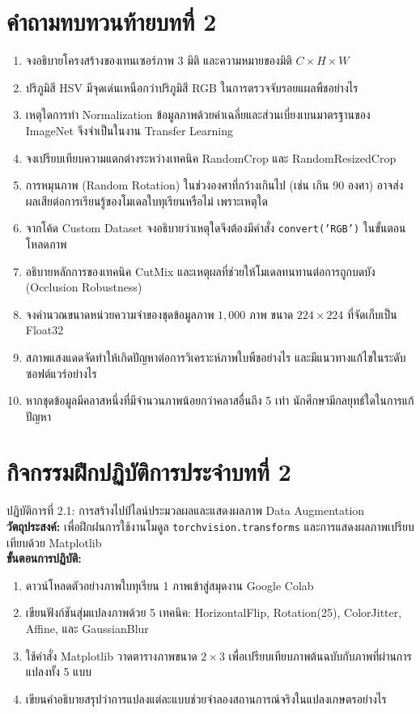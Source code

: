 \section*{คำถามทบทวนท้ายบทที่ 2}
\begin{enumerate}[leftmargin=1.8em, itemsep=4pt]
    \item จงอธิบายโครงสร้างของเทนเซอร์ภาพ 3 มิติ และความหมายของมิติ $C \times H \times W$
    \item ปริภูมิสี HSV มีจุดเด่นเหนือกว่าปริภูมิสี RGB ในการตรวจจับรอยแผลพืชอย่างไร
    \item เหตุใดการทำ Normalization ข้อมูลภาพด้วยค่าเฉลี่ยและส่วนเบี่ยงเบนมาตรฐานของ ImageNet จึงจำเป็นในงาน Transfer Learning
    \item จงเปรียบเทียบความแตกต่างระหว่างเทคนิค RandomCrop และ RandomResizedCrop
    \item การหมุนภาพ (Random Rotation) ในช่วงองศาที่กว้างเกินไป (เช่น เกิน 90 องศา) อาจส่งผลเสียต่อการเรียนรู้ของโมเดลใบทุเรียนหรือไม่ เพราะเหตุใด
    \item จากโค้ด Custom Dataset จงอธิบายว่าเหตุใดจึงต้องมีคำสั่ง \texttt{convert('RGB')} ในขั้นตอนโหลดภาพ
    \item อธิบายหลักการของเทคนิค CutMix และเหตุผลที่ช่วยให้โมเดลทนทานต่อการถูกบดบัง (Occlusion Robustness)
    \item จงคำนวณขนาดหน่วยความจำของชุดข้อมูลภาพ $1,000$ ภาพ ขนาด $224 \times 224$ ที่จัดเก็บเป็น Float32
    \item สภาพแสงแดดจัดทำให้เกิดปัญหาต่อการวิเคราะห์ภาพใบพืชอย่างไร และมีแนวทางแก้ไขในระดับซอฟต์แวร์อย่างไร
    \item หากชุดข้อมูลมีคลาสหนึ่งที่มีจำนวนภาพน้อยกว่าคลาสอื่นถึง 5 เท่า นักศึกษามีกลยุทธ์ใดในการแก้ปัญหา
\end{enumerate}

\section*{กิจกรรมฝึกปฏิบัติการประจำบทที่ 2}
\begin{nocodebox}{ปฏิบัติการที่ 2.1: การสร้างไปป์ไลน์ประมวลผลและแสดงผลภาพ Data Augmentation}
\textbf{วัตถุประสงค์:} เพื่อฝึกฝนการใช้งานโมดูล \texttt{torchvision.transforms} และการแสดงผลภาพเปรียบเทียบด้วย Matplotlib\\
\textbf{ขั้นตอนการปฏิบัติ:}
\begin{enumerate}[leftmargin=1.4em, itemsep=2pt]
    \item ดาวน์โหลดตัวอย่างภาพใบทุเรียน 1 ภาพเข้าสู่สมุดงาน Google Colab
    \item เขียนฟังก์ชันสุ่มแปลงภาพด้วย 5 เทคนิค: HorizontalFlip, Rotation(25), ColorJitter, Affine, และ GaussianBlur
    \item ใช้คำสั่ง Matplotlib วาดตารางภาพขนาด $2 \times 3$ เพื่อเปรียบเทียบภาพต้นฉบับกับภาพที่ผ่านการแปลงทั้ง 5 แบบ
    \item เขียนคำอธิบายสรุปว่าการแปลงแต่ละแบบช่วยจำลองสถานการณ์จริงในแปลงเกษตรอย่างไร
\end{enumerate}
\end{nocodebox}
